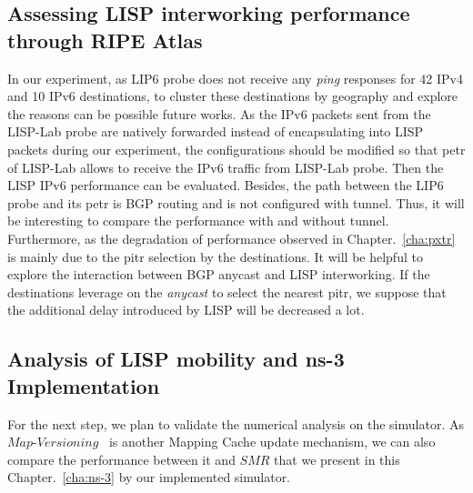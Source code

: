 \subsection{Assessing LISP interworking performance through RIPE Atlas}
In our experiment, as LIP6 probe does not receive any \emph{ping} responses for 42 IPv4 and 10 IPv6 destinations, to cluster these destinations by geography and explore the reasons can be possible future works. As the IPv6 packets sent from the LISP-Lab probe are natively forwarded instead of encapsulating into LISP packets during our experiment, the configurations should be modified so that \acrshort{petr} of LISP-Lab allows to receive the IPv6 traffic from LISP-Lab probe. Then the LISP IPv6 performance can be evaluated. Besides, the path between the LIP6 probe and its \acrshort{petr} is BGP routing and is not configured with tunnel. Thus, it will be interesting to compare the performance with and without tunnel. Furthermore, as the degradation of performance observed in Chapter.~\ref{cha:pxtr} is mainly due to the \acrshort{pitr} selection by the destinations. It will be helpful to explore the interaction between BGP anycast and LISP interworking. If the destinations leverage on the \emph{anycast} to select the nearest \acrshort{pitr}, we suppose that the additional delay introduced by LISP will be decreased a lot.

\subsection{Analysis of LISP mobility and ns-3 Implementation}
For the next step, we plan to validate the numerical analysis on the simulator. As $Map\textbf{-}Versioning$~\cite{rfc6834} is another Mapping Cache update mechanism, we can also compare the performance between it and $SMR$ that we present in this Chapter.~\ref{cha:ns-3} by our implemented simulator. 

